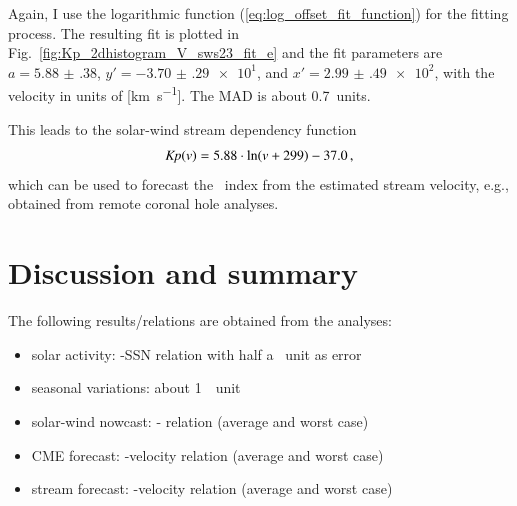 Again, I use the logarithmic function (\ref{eq:log_offset_fit_function}) for the fitting process. The resulting fit is plotted in Fig.~\ref{fig:Kp_2dhistogram_V_sws23_fit_e} and the fit parameters are $a = \num{5.88(38)}$, $y' = \num{-3.70(29)e1}$, and $x' = \num{2.99(49)e2}$, with the velocity in units of [\si{\km\per\s}]. The MAD is about \SI{0.7}{\Kp}~units.
\begin{figure}
\end{figure}
This leads to the solar-wind stream dependency function
\begin{align}
	\textit{Kp}(v) = 5.88 \cdot \ln(v + 299) - 37.0	\,,	\label{eq:kpvsv_sws23_dependency_function}
\end{align}
which can be used to forecast the \Kp{}~index from the estimated stream velocity, e.g., obtained from remote coronal hole analyses.


\section{Discussion and summary}
The following results/relations are obtained from the analyses:
\begin{itemize}
	\item solar activity: \Kp{}-SSN relation with half a \Kp{}~unit as error
	\item seasonal variations: about 1~\Kp{}~unit
	\item solar-wind nowcast: \Kp-\vBz{} relation (average and worst case)
	\item CME forecast: \Kp-velocity relation (average and worst case)
	\item stream forecast: \Kp-velocity relation (average and worst case)
\end{itemize}

